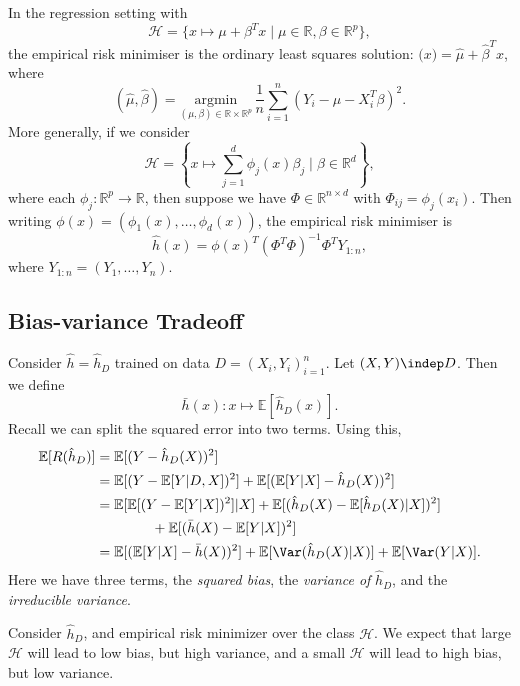 \documentclass[12pt]{article}
\begin{document}
\begin{exbox}
	In the regression setting with 
	\[
		\mathcal{H} = \{x \mapsto \mu + \beta^{T}x \mid \mu \in \mathbb{R}, \beta \in \mathbb{R}^p\},
	\]
	the empirical risk minimiser is the ordinary least squares solution: $\hat (x) = \hat \mu + \hat \beta^{T}x$, where
	\[
		(\hat \mu, \hat \beta) = \underset{(\mu, \beta) \in \mathbb{R} \times \mathbb{R}^p}{\mathrm{argmin}} \, \frac{1}{n} \sum_{i = 1}^n (Y_i - \mu - X_i^{T}\beta)^2.
	\]
	More generally, if we consider
	\[
		\mathcal{H} = \left\{ x \mapsto \sum_{j = 1}^d \phi_j(x) \beta_j \mid \beta \in \mathbb{R}^d\right\},
	\]
	where each $\phi_j : \mathbb{R}^p \to \mathbb{R}$, then suppose we have $\Phi \in \mathbb{R}^{n \times d}$ with $\Phi_{ij} = \phi_j (x_i)$. Then writing $\phi(x) = (\phi_1(x), \ldots, \phi_d(x))$, the empirical risk minimiser is
	\[
	\hat h(x) = \phi(x)^{T}(\Phi^{T} \Phi)^{-1} \Phi^{T} Y_{1:n},
	\]
	where $Y_{1:n} = (Y_1, \ldots, Y_n)$.
\end{exbox}

\subsection{Bias-variance Tradeoff}
\label{sub:bv}

Consider $\hat h = \hat h_D$ trained on data $D = (X_i, Y_i)_{i=1}^n$. Let $(X, Y) \indep D$. Then we define
\[
\bar h(x) : x \mapsto \mathbb{E}[\hat h_D(x)].
\]
Recall we can split the squared error into two terms. Using this,
\begin{align*}
	\mathbb{E}[R(\hat h_D)] &= \mathbb{E}[(Y - \hat h_D(X))^2] \\
				&= \mathbb{E}[(Y - \mathbb{E}[Y|D,X])^2] + \mathbb{E}[(\mathbb{E}[Y|X] - \hat h_D(X))^2] \\
				&= \mathbb{E}[\mathbb{E}[(Y - \mathbb{E}[Y|X])^2]|X] + \mathbb{E}[(\hat h_D(X) - \mathbb{E}[\hat h_D(X)|X])^2] \\
				& \qquad \qquad + \mathbb{E}[(\bar h(X) - \mathbb{E}[Y|X])^2] \\
				&= \mathbb{E}[(\mathbb{E}[Y|X] - \bar h(X))^2] + \mathbb{E}[\Var(\hat h_D(X)|X)] + \mathbb{E}[\Var(Y|X)].
\end{align*}
Here we have three terms, the \emph{squared bias}, the \emph{variance of} $\hat h_D$, and the \emph{irreducible variance}.


Consider $\hat h_D$, and empirical risk minimizer over the class $\mathcal{H}$. We expect that large $\mathcal{H}$ will lead to low bias, but high variance, and a small $\mathcal{H}$ will lead to high bias, but low variance.
\end{document}
